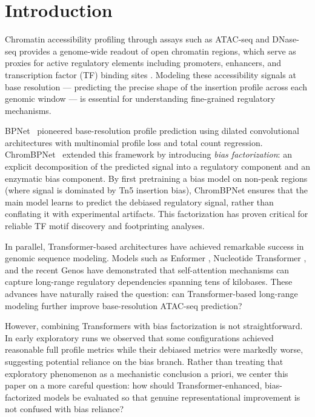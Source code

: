 \documentclass[11pt,a4paper]{article}
\begin{document}
\section{Introduction}
\label{sec:intro}

Chromatin accessibility profiling through assays such as ATAC-seq and
DNase-seq provides a genome-wide readout of open chromatin regions,
which serve as proxies for active regulatory elements including
promoters, enhancers, and transcription factor (TF) binding sites
\cite{buenrostro2013transposition}. Modeling these accessibility signals
at base resolution --- predicting the precise shape of the insertion
profile across each genomic window --- is essential for understanding
fine-grained regulatory mechanisms.

BPNet~\cite{avsec2021base} pioneered base-resolution profile prediction
using dilated convolutional architectures with multinomial profile loss
and total count regression. ChromBPNet~\cite{pampari2023chrombpnet}
extended this framework by introducing \emph{bias factorization}: an
explicit decomposition of the predicted signal into a regulatory
component and an enzymatic bias component. By first pretraining a bias
model on non-peak regions (where signal is dominated by Tn5 insertion
bias), ChromBPNet ensures that the main model learns to predict the
debiased regulatory signal, rather than conflating it with experimental
artifacts. This factorization has proven critical for reliable TF motif
discovery and footprinting analyses.

In parallel, Transformer-based architectures have achieved remarkable
success in genomic sequence modeling. Models such as Enformer
\cite{avsec2021effective}, Nucleotide Transformer
\cite{dallachiesa2023nucleotide}, and the recent Genos
\cite{genos2025} have demonstrated that self-attention mechanisms
can capture long-range regulatory dependencies spanning tens of
kilobases. These advances have naturally raised the question: can
Transformer-based long-range modeling further improve base-resolution
ATAC-seq prediction?

However, combining Transformers with bias factorization is not
straightforward. In early exploratory runs we observed that some
configurations achieved reasonable full profile metrics while their
debiased metrics were markedly worse, suggesting potential reliance on
the bias branch. Rather than treating that exploratory phenomenon as a
mechanistic conclusion a priori, we center this paper on a more careful
question: how should Transformer-enhanced, bias-factorized models be
evaluated so that genuine representational improvement is not confused
with bias reliance?
\end{document}
